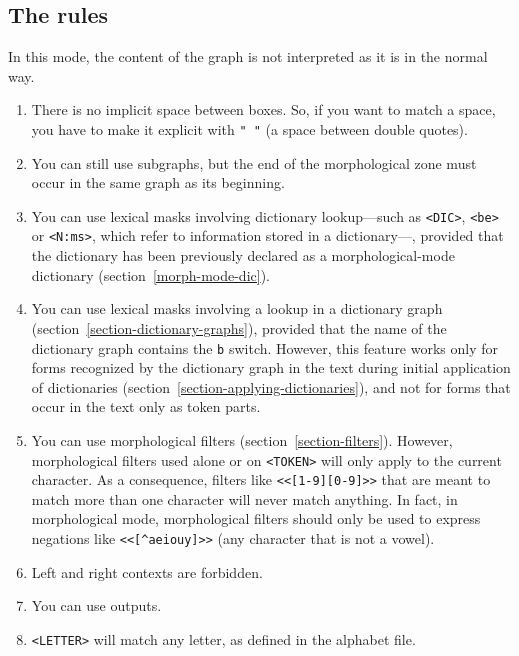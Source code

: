 \subsection{The rules}
In this mode, the content of the graph is not interpreted as it is
in the normal way.
\begin{enumerate}
  \item There is no implicit space between boxes. So, if you
want to match a space, you have to make it explicit with \verb+" "+ (a space
between double quotes).

   \item You can still use subgraphs, but the end of the morphological zone
   must occur in the same graph as its beginning.

   \item You can use lexical masks involving dictionary lookup---such as \verb+<DIC>+,
   \verb+<be>+ or \verb+<N:ms>+, which refer to information stored in a dictionary---, provided
   that the dictionary has been previously declared as a morphological-mode dictionary
   (section~\ref{morph-mode-dic}).

   \item You can use lexical masks involving a lookup in a dictionary graph (section~\ref{section-dictionary-graphs}),
   provided that the name of the dictionary graph contains the \verb+b+ switch. However,
   this feature works only for forms recognized by the dictionary graph in the text during
   initial application of dictionaries (section~\ref{section-applying-dictionaries}), and not for
   forms that occur in the text only as token parts.
   
   \item You can use morphological filters (section~\ref{section-filters}). However, morphological filters
   used alone or on \verb+<TOKEN>+ will only apply to the current character. As a
   consequence, filters like \verb+<<[1-9][0-9]>>+ that are meant to match more than
   one character will never match anything. In fact, in morphological mode, 
   morphological filters should only be used to express negations like 
   \verb+<<[^aeiouy]>>+ (any character that is not a vowel). 
   
   \item Left and right contexts are forbidden.

   \item You can use outputs.
   
    \item \verb+<LETTER>+ will match any letter, as defined in the alphabet
    file.


\end{enumerate}
